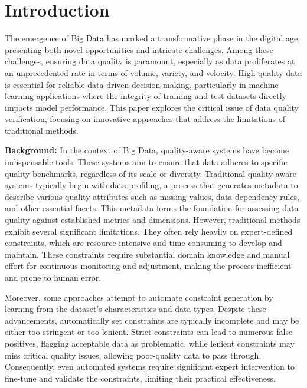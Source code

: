 \section{Introduction}
The emergence of Big Data has marked a transformative phase in the digital age, presenting both novel opportunities and intricate challenges. Among these challenges, ensuring data quality is paramount, especially as data proliferates at an unprecedented rate in terms of volume, variety, and velocity. High-quality data is essential for reliable data-driven decision-making, particularly in machine learning applications where the integrity of training and test datasets directly impacts model performance. This paper explores the critical issue of data quality verification, focusing on innovative approaches that address the limitations of traditional methods.

\noindent\textbf{Background:} 
 In the context of Big Data, quality-aware systems have become indispensable tools. These systems aim to ensure that data adheres to specific quality benchmarks, regardless of its scale or diversity. Traditional quality-aware systems typically begin with data profiling, a process that generates metadata to describe various quality attributes such as missing values, data dependency rules, and other essential facets. This metadata forms the foundation for assessing data quality against established metrics and dimensions. However, traditional methods exhibit several significant limitations. They often rely heavily on expert-defined constraints, which are resource-intensive and time-consuming to develop and maintain. These constraints require substantial domain knowledge and manual effort for continuous monitoring and adjustment, making the process inefficient and prone to human error.

Moreover, some approaches attempt to automate constraint generation by learning from the dataset’s characteristics and data types. Despite these advancements, automatically set constraints are typically incomplete and may be either too stringent or too lenient. Strict constraints can lead to numerous false positives, flagging acceptable data as problematic, while lenient constraints may miss critical quality issues, allowing poor-quality data to pass through. Consequently, even automated systems require significant expert intervention to fine-tune and validate the constraints, limiting their practical effectiveness.

